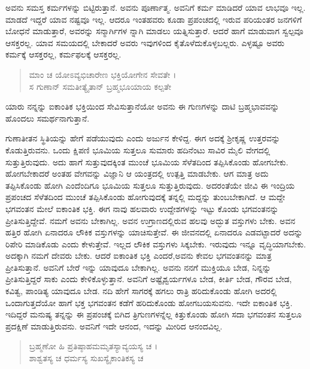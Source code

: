 ಅವನು ಸಮಸ್ತ ಕರ್ಮಗಳನ್ನು ಬಿಟ್ಟಿರುತ್ತಾನೆ. ಅವನು ಪೂರ್ಣಾತ್ಮ. ಅವನಿಗೆ ಕರ್ಮ ಮಾಡಿದರೆ ಯಾವ ಲಾಭವೂ ಇಲ್ಲ. ಮಾಡದೆ ಇದ್ದರೆ ಯಾವ ನಷ್ಟವೂ ಇಲ್ಲ. ಆದರೂ ಇಂತಹವರು ಕೂಡಾ ಪ್ರಪಂಚದಲ್ಲಿ ಇರುವ ಪರಿಯಂತರ ಜನಗಳಿಗೆ ಬೋಧನೆ ಮಾಡುತ್ತಾರೆ, ಅವರನ್ನು ಸನ್ಮಾರ್ಗಿಗಳ ನ್ನಾಗಿ ಮಾಡಲು ಯತ್ನಿಸುತ್ತಾರೆ. ಆದರೆ ಹಾಗೆ ಮಾಡುವಾಗ ಸ್ವಲ್ಪವೂ ಆಸಕ್ತರಲ್ಲ. ಯಾವ ಸಮಯದಲ್ಲಿ ಬೇಕಾದರೆ ಅವರು ಇವುಗಳಿಂದ ಕೈತೊಳೆದುಕೊಳ್ಳಬಲ್ಲರು. ಎಳ್ಳಷ್ಟೂ ಅವರು ಕರ್ಮಕ್ಕೆ ಆಸಕ್ತರಲ್ಲ, ಕರ್ಮಫಲಕ್ಕೆ ಆಸಕ್ತರಲ್ಲ.

\begin{verse}
ಮಾಂ ಚ ಯೋಽವ್ಯಭಿಚಾರೇಣ ಭಕ್ತಿಯೋಗೇನ ಸೇವತೇ ।\\ಸ ಗುಣಾನ್ ಸಮತೀತ್ಯೈತಾನ್ ಬ್ರಹ್ಮಭೂಯಾಯ ಕಲ್ಪತೇ 
\end{verse}

{\small ಯಾರು ನನ್ನನ್ನು ಐಕಾಂತಿಕ ಭಕ್ತಿಯಿಂದ ಸೇವಿಸುತ್ತಾನೆಯೋ ಅವನು ಈ ಗುಣಗಳನ್ನು ದಾಟಿ ಬ್ರಹ್ಮಭಾವವನ್ನು ಹೊಂದಲು ಸಮರ್ಥನಾಗುತ್ತಾನೆ.}

ಗುಣಾತೀತನ ಸ್ಥಿತಿಯನ್ನು ಹೇಗೆ ಪಡೆಯುವುದು ಎಂದು ಅರ್ಜುನ ಕೇಳಿದ್ದ. ಈಗ ಅದಕ್ಕೆ ಶ್ರೀಕೃಷ್ಣ ಉತ್ತರವನ್ನು ಕೊಡುತ್ತಿರುವನು. ಒಂದು ಕ್ಷಿಪಣಿ ಭೂಮಿಯ ಸುತ್ತಲೂ ಸುಮಾರು ಹದಿನೆಂಟು ಸಾವಿರ ಮೈಲಿ ವೇಗದಲ್ಲಿ ಸುತ್ತುತ್ತಿರುವುದು. ಅದು ಹಾಗೆ ಸುತ್ತುವುದಕ್ಕಿಂತ ಮುಂಚೆ ಭೂಮಿಯ ಸೆಳೆತದಿಂದ ತಪ್ಪಿಸಿಕೊಂಡು ಹೋಗಬೇಕು. ಹೋಗಬೇಕಾದರೆ ಅಂತಹ ವೇಗವನ್ನು ವಿಜ್ಞಾನಿ ಆ ಯಂತ್ರದಲ್ಲಿ ಉತ್ಪತ್ತಿ ಮಾಡಬೇಕು. ಆಗ ಮಾತ್ರ ಅದು ತಪ್ಪಿಸಿಕೊಂಡು ಹೋಗಿ ಎಂದೆಂದಿಗೂ ಭೂಮಿಯ ಸುತ್ತಲೂ ಸುತ್ತುತ್ತಿರುವುದು. ಅದರಂತೆಯೇ ಜೀವಿ ಈ ಇಂದ್ರಿಯ ಪ್ರಪಂಚದ ಸೆಳೆತದಿಂದ ಮುಂಚೆ ತಪ್ಪಿಸಿಕೊಂಡು ಹೋಗುವುದಕ್ಕೆ ತನ್ನಲ್ಲಿ ಮದ್ದನ್ನು ತುಂಬಬೇಕಾಗಿದೆ. ಆ ಮದ್ದೇ ಭಗವಂತನ ಮೇಲೆ ಐಕಾಂತಿಕ ಭಕ್ತಿ. ಈಗ ನಾವು ಹಲವಾರು ಉದ್ದೇಶಗಳನ್ನು ಇಟ್ಟು ಕೊಂಡು ಭಗವಂತನನ್ನು ಪ್ರೀತಿಸುತ್ತಿದ್ದೇವೆ. ನಮಗೆ ಅವನು ಬೇಕಾಗಿಲ್ಲ. ಅವನ ಉಗ್ರಾಣದಲ್ಲಿರುವ ಹಲವು ಅದ್ಭುತ ವಸ್ತುಗಳು ಬೇಕು. ಅವನ ಹತ್ತಿರ ಹೋಗಿ ಏನಾದರೂ ಲೌಕಿಕ ವಸ್ತುಗಳನ್ನು ಯಾಚಿಸುತ್ತೇವೆ. ಈ ಜೀವನದಲ್ಲಿ ಏನಾದರೂ ಎಡವಟ್ಟಾದರೆ ಅದನ್ನು ರಿಪೇರಿ ಮಾಡಿಕೊಡು ಎಂದು ಕೇಳುತ್ತೇವೆ. ಇಲ್ಲದ ಲೌಕಿಕ ವಸ್ತುಗಳು ಸಿಕ್ಕಬೇಕು. ಇರುವುದು ಇನ್ನೂ ವೃದ್ಧಿಯಾಗಬೇಕು. ಅದಕ್ಕಾಗಿ ನಮಗೆ ದೇವರು ಬೇಕು. ಆದರೆ ಐಕಾಂತಿಕ ಭಕ್ತಿ ಎಂದರೆ,ಅವನು ಕೇವಲ ಭಗವಂತನನ್ನು ಮಾತ್ರ ಪ್ರೀತಿಸುತ್ತಾನೆ. ಅವನಿಗೆ ಬೇರೆ ಇನ್ನು ಯಾವುದೂ ಬೇಕಾಗಿಲ್ಲ. ಅವನು ನನಗೆ ಮುಕ್ತಿಯೂ ಬೇಡ, ನಿನ್ನನ್ನು ಪ್ರೀತಿಸುತ್ತಿದ್ದರೆ ಸಾಕು ಎಂದು ಕೇಳಿಕೊಳ್ಳುತ್ತಾನೆ. ಅವನಿಗೆ ಅಷ್ಟೈಶ್ವರ್ಯಗಳೂ ಬೇಡ, ಕೀರ್ತಿ ಬೇಡ, ಗೌರವ ಬೇಡ, ಕವಿತ್ವ, ಪಾಂಡಿತ್ಯ ಯಾವುದೂ ಬೇಡ. ನದಿ ಹೇಗೆ ಸಾಗರಕ್ಕೆ ಹಗಲು ರಾತ್ರಿ ಹರಿದುಕೊಂಡು ಹೋಗಿ ಅದರಲ್ಲಿ ಒಂದಾಗುತ್ತದೆಯೋ ಹಾಗೆ ಭಕ್ತ ಭಗವಂತನ ಕಡೆಗೆ ಹರಿದುಕೊಂಡು ಹೋಗಬಯಸುವನು. ಇದೇ ಐಕಾಂತಿಕ ಭಕ್ತಿ. ಇದಿದ್ದರೆ ಮನುಷ್ಯ ತನ್ನನ್ನು ಈ ಪ್ರಪಂಚಕ್ಕೆ ಬಿಗಿದ ತ್ರಿಗುಣಗಳನ್ನೆಲ್ಲ ಕಿತ್ತುಕೊಂಡು ಹೋಗಿ ಸದಾ ಭಗವಂತನ ಸುತ್ತಲೂ ಪ್ರದಕ್ಷಿಣೆ ಮಾಡುತ್ತಿರುವನು. ಅವನಿಗೆ ಇದೇ ಆನಂದ, ಇದನ್ನು ಮೀರಿದ ಆನಂದವಿಲ್ಲ.

\begin{verse}
ಬ್ರಹ್ಮಣೋ ಹಿ ಪ್ರತಿಷ್ಠಾಹಮಮೃತಸ್ಯಾವ್ಯಯಸ್ಯ ಚ ।\\ಶಾಶ್ವತಸ್ಯ ಚ ಧರ್ಮಸ್ಯ ಸುಖಸ್ಯೈಕಾಂತಿಕಸ್ಯ ಚ 
\end{verse}

